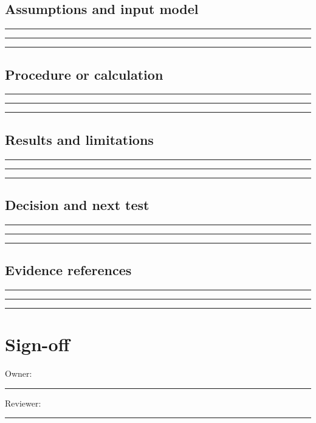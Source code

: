 \documentclass[11pt]{article}
\begin{document}
\subsection{Assumptions and input model}
\noindent\rule{\linewidth}{0.35pt}\par\vspace{0.22in}
\noindent\rule{\linewidth}{0.35pt}\par\vspace{0.22in}
\noindent\rule{\linewidth}{0.35pt}\par\vspace{0.18in}

\subsection{Procedure or calculation}
\noindent\rule{\linewidth}{0.35pt}\par\vspace{0.22in}
\noindent\rule{\linewidth}{0.35pt}\par\vspace{0.22in}
\noindent\rule{\linewidth}{0.35pt}\par\vspace{0.18in}

\subsection{Results and limitations}
\noindent\rule{\linewidth}{0.35pt}\par\vspace{0.22in}
\noindent\rule{\linewidth}{0.35pt}\par\vspace{0.22in}
\noindent\rule{\linewidth}{0.35pt}\par\vspace{0.18in}

\subsection{Decision and next test}
\noindent\rule{\linewidth}{0.35pt}\par\vspace{0.22in}
\noindent\rule{\linewidth}{0.35pt}\par\vspace{0.22in}
\noindent\rule{\linewidth}{0.35pt}\par\vspace{0.18in}

\subsection{Evidence references}
\noindent\rule{\linewidth}{0.35pt}\par\vspace{0.22in}
\noindent\rule{\linewidth}{0.35pt}\par\vspace{0.22in}
\noindent\rule{\linewidth}{0.35pt}\par\vspace{0.18in}

\section{Sign-off}
Owner: \rule{0.38\linewidth}{0.4pt}\hfill Reviewer: \rule{0.38\linewidth}{0.4pt}\par
\end{document}
